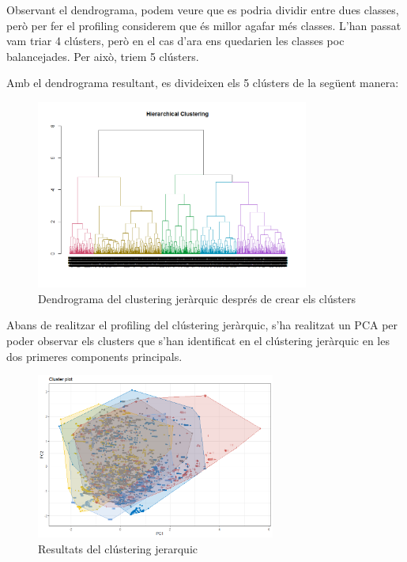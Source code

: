 Observant el dendrograma, podem veure que es podria dividir entre dues classes, però per fer el profiling considerem que és millor agafar més classes. L'han passat vam triar 4 clústers, però en el cas d'ara ens quedarien les classes poc balancejades. Per això, triem 5 clústers.  

Amb el dendrograma resultant, es divideixen els 5 clústers de la següent manera: 

\begin{figure}[H]
    \centering
    \includegraphics[width=0.8\textwidth]{Images/4_clustering/herarchical/hierarchical_dendogram_colors2.png}
    \caption{Dendrograma del clustering jeràrquic després de crear els clústers}
    \label{fig:hierarchical_dendogram_colors2}
\end{figure}

Abans de realitzar el profiling del clústering jeràrquic, s'ha realitzat un PCA per poder observar els clusters que s'han identificat en el clústering jeràrquic en les dos primeres components principals.

\begin{figure}[H]
    \centering
    \includegraphics[width=0.7\textwidth]{Images/4_clustering/herarchical/pca_hierarchical.png}
    \caption{Resultats del clústering jerarquic}
    \label{fig:pca_hierarchical}
\end{figure}


